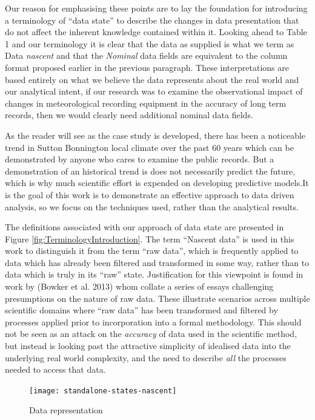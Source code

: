 \documentclass[smallextended]{svjour3}       %
\begin{document}
Our reason for emphasising these points are to lay the foundation for
introducing a terminology of ``data state'' to describe the changes in
data presentation that do not affect the inherent knowledge contained
within it. Looking ahead to Table 1 and our terminology it is clear that the data as supplied is what we term as Data \emph{nascent} and that the \emph{Nominal} data fields are equivalent to the column format proposed earlier in the previous paragraph. These interpretations are based entirely on what we believe the data represents about the real world and our analytical intent, if our research was to examine the observational impact of changes in meteorological recording equipment in the accuracy of long term records, then we would clearly need additional nominal data fields.

As the reader will see as the case study is developed, there has been a
noticeable trend in Sutton Bonnington local climate over the past 60
years which can be demonstrated by anyone who cares to examine the
public records. But a demonstration of an historical trend is does not
necessarily predict the future, which is why much scientific effort is
expended on developing predictive models.It is the goal of this work is
to demonstrate an effective approach to data driven analysis, so we
focus on the techniques used, rather than the analytical results.

The definitions associated with our approach of data state are presented
in Figure \ref{fig:TerminologyIntroduction}. The term ``Nascent data'' is
used in this work to distinguish it from the term ``raw data'', which is
frequently applied to data which has already been filtered and
transformed in some way, rather than to data which is truly in its ``raw''
state. Justification for this viewpoint is found in work by
(Bowker et al. 2013) whom collate a series of essays challenging presumptions
on the nature of raw data. These illustrate scenarios across multiple
scientific domains where ``raw data'' has been transformed and filtered by
processes applied prior to incorporation into a formal methodology. This
should not be seen as an attack on the \emph{accuracy} of data used in the
scientific method, but instead is looking past the attractive simplicity
of idealised data into the underlying real world complexity, and the
need to describe \emph{all} the processes needed to access that data.

\begin{figure}

{\centering \texttt{[image: standalone-states-nascent]} 

}

\caption{ Data representation}\label{fig:FigTheoryNascentData}
\end{figure}
\end{document}
